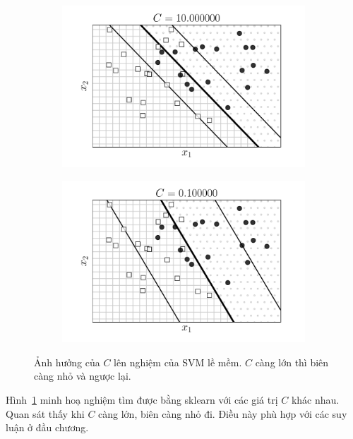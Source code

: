 \begin{figure}[t]
    \begin{subfigure}{0.45\textwidth}
        \includegraphics[width=0.95\linewidth]{ebookML_src/src/softmargin_svm/ssvm5_10.pdf}
    \end{subfigure}
    \begin{subfigure}{0.45\textwidth}
        \includegraphics[width=0.95\linewidth]{ebookML_src/src/softmargin_svm/ssvm5_01.pdf}
    \end{subfigure}
    \caption{
    Ảnh hưởng của \(C\) lên nghiệm của SVM lề mềm. $C$ càng lớn thì biên
    càng nhỏ và ngược lại.
    }
    \label{fig:20_6}
\end{figure}
 
Hình~\ref{fig:20_6} minh hoạ nghiệm tìm được bằng sklearn với các giá trị $C$
khác nhau. Quan sát thấy khi $C$ càng lớn, biên càng nhỏ đi. Điều này phù hợp
với các suy luận ở đầu chương.
 
